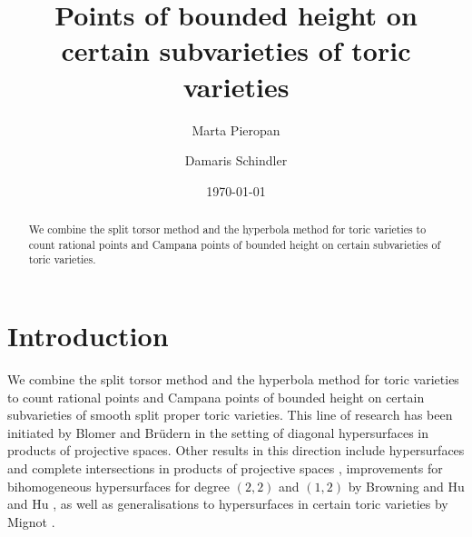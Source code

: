 \documentclass[10pt, a4paper, reqno, english]{amsart}
\theoremstyle{definition}
\numberwithin{theorem}{section}
\numberwithin{equation}{section}
\begin{document}
\setcounter{tocdepth}{2}

\title{Points of bounded height on certain subvarieties of toric varieties}
  
\author{Marta Pieropan} 
\author{Damaris Schindler} 

\address{Utrecht University, Mathematical Institute, Budapestlaan 6, 3584 CD Utrecht, the Netherlands}
\address{Mathematisches Institut, Universitaet Goettingen, Bunsenstrasse 3-5, 37073 Goettingen, Germany}

\date{\today}





\begin{abstract}
We combine the split torsor method and the hyperbola method for toric varieties to count rational points and Campana points of bounded height on certain subvarieties of toric varieties.
\end{abstract}

\maketitle
\tableofcontents


\section{Introduction}
	We combine the split torsor method and the hyperbola method for toric varieties to count rational points
	 and Campana points of bounded height on certain subvarieties of smooth split proper toric varieties. 
	 This line of research has been initiated by Blomer and Br\"udern \cite{BB} in the setting of diagonal hypersurfaces 
	 in products of projective spaces. Other results in this direction include hypersurfaces and complete intersections 
	 in products of projective spaces \cite{Sch}, improvements for bihomogeneous hypersurfaces for degree $(2,2)$ 
	 and $(1,2)$ by Browning and Hu \cite{BroHu} and Hu \cite{Hu}, as well as generalisations to hypersurfaces 
	 in certain toric varieties by Mignot \cite{mignot1, Mignot, mignot2}.\par
	 
\end{document}
